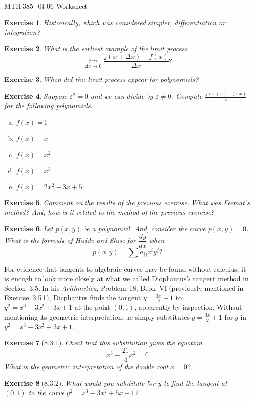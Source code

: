 \documentclass[12pt]{article}
\theoremstyle{plain}
\newtheorem{ex}{Exercise}
\begin{document}
MTH 385 -04-06 Worksheet

\begin{ex}
  Historically, which was considered simpler, differentiation or integration?
\end{ex}

\begin{ex}
  What is the earliest example of the limit process
  \[
    \lim_{\Delta x\to0}\frac{f(x+\Delta x)-f(x)}{\Delta x}?
  \]
\end{ex}

\begin{ex}
  When did this limit process appear for polynomials?
\end{ex}

\begin{ex}
  Suppose $\varepsilon^2=0$ and we can divide by $\varepsilon\neq0$. Compute $\displaystyle\frac{f(x+\varepsilon)-f(x)}{\varepsilon}$ for the following polynomials.
  \begin{enumerate}[(a)]
    \item $f(x)=1$
    \item $f(x)=x$
    \item $f(x)=x^2$
    \item $f(x)=x^3$
    \item $f(x)=2x^2-3x+5$
  \end{enumerate}
\end{ex}

\begin{ex}
  Comment on the results of the previous exercise. What was Fermat's method? And, how is it related to the method of the previous exercise?
\end{ex}

\begin{ex}
  Let $p(x,y)$ be a polynomial. And, consider the curve $p(x,y)=0$. What is the formula of Hudde and Sluse for $\dfrac{dy}{dx}$ when
  \[
    p(x,y)=\sum a_{ij}x^iy^j?
  \]
\end{ex}

For evidence that tangents to algebraic curves may be found without calculus, it is enough to look more closely at what we called Diophantus's tangent method in Section~3.5. In his \emph{Arithmetica}, Problem~18, Book~VI (previously mentioned in Exercise~3.5.1), Diophantus finds the tangent $y=\frac{3x}{2}+1$ to $y^2=x^3-3x^2+3x+1$ at the point $(0,1)$, apparently by inspection. Without mentioning its geometric interpretation, he simply substitutes $y=\frac{3x}{2}+1$ for $y$ in $y^2=x^3-3x^2+3x+1$.

\begin{ex} [8.3.1]
  Check that this substitution gives the equation
  \[
    x^3-\frac{21}{4}x^2=0
  \]
  What is the geometric interpretation of the double root $x=0$?
\end{ex}

\begin{ex} [8.3.2]
  What would you substitute for y to find the tangent at $(0,1)$ to the curve $y^2=x^3-3x^2+5x+1$?
\end{ex}
\end{document}
